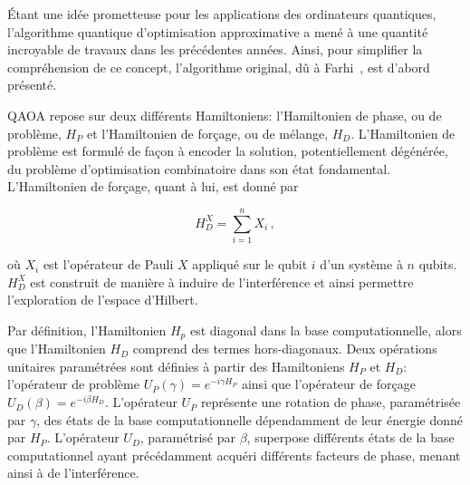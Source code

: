 Étant une idée prometteuse pour les applications des ordinateurs quantiques, l'algorithme quantique d'optimisation approximative a mené à une quantité incroyable de travaux dans les précédentes années. Ainsi, pour simplifier la compréhension de ce concept, l'algorithme original, dû à Farhi~\cite{farhiQuantumApproximateOptimization2014}, est d'abord présenté.

QAOA repose sur deux différents Hamiltoniens: l'Hamiltonien de phase, ou de problème, $H_{P}$ et l'Hamiltonien de forçage, ou de mélange, $H_{D}$. L'Hamiltonien de problème est formulé de façon à encoder la solution, potentiellement dégénérée, du problème d'optimisation combinatoire dans son état fondamental. L'Hamiltonien de forçage, quant à lui, est donné par

\begin{equation}
    \label{eq:x-drive}
    H_{D}^{X} = \sum_{i=1}^{n} X_{i} \,,
\end{equation}

où $X_{i}$ est l'opérateur de Pauli $X$ appliqué sur le qubit $i$ d'un système à $n$ qubits. $H_{D}^{X}$ est construit de manière à induire de l'interférence et ainsi permettre l'exploration de l'espace d'Hilbert. 

Par définition, l'Hamiltonien $H_{p}$ est diagonal dans la base computationnelle, alors que l'Hamiltonien $H_{D}$ comprend des termes hors-diagonaux. Deux opérations unitaires paramétrées sont définies à partir des Hamiltoniens $H_{P}$ et $H_{D}$: l'opérateur de problème $U_{P}(\gamma) = e^{-i \gamma H_{P}}$ ainsi que l'opérateur de forçage $U_{D}(\beta) = e^{-i \beta H_{D}}$. L'opérateur $U_{P}$ représente une rotation de phase, paramétrisée par $\gamma$, des états de la base computationnelle dépendamment de leur énergie donné par $H_{P}$. L'opérateur $U_{D}$, paramétrisé par $\beta$, superpose différents états de la base computationnel ayant précédamment acquéri différents facteurs de phase, menant ainsi à de l'interférence.

